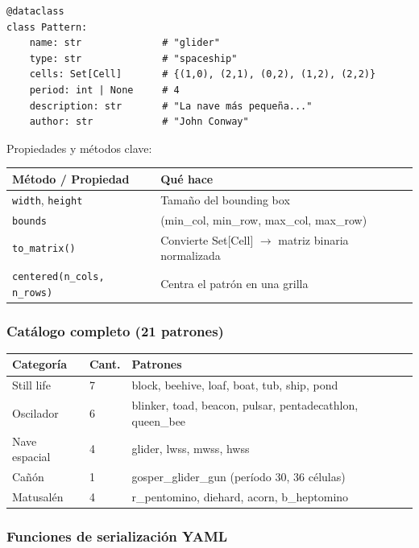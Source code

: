 \documentclass[12pt,a4paper]{article}
\begin{document}
\begin{lstlisting}
@dataclass
class Pattern:
    name: str              # "glider"
    type: str              # "spaceship"
    cells: Set[Cell]       # {(1,0), (2,1), (0,2), (1,2), (2,2)}
    period: int | None     # 4
    description: str       # "La nave más pequeña..."
    author: str            # "John Conway"
\end{lstlisting}

Propiedades y métodos clave:

\begin{table}[h]
\centering
\begin{tabular}{ll}
\toprule
\textbf{Método / Propiedad} & \textbf{Qué hace} \\
\midrule
\texttt{width}, \texttt{height} & Tamaño del bounding box \\
\texttt{bounds}                 & (min\_col, min\_row, max\_col, max\_row) \\
\texttt{to\_matrix()}           & Convierte Set[Cell] $\to$ matriz binaria normalizada \\
\texttt{centered(n\_cols, n\_rows)} & Centra el patrón en una grilla \\
\bottomrule
\end{tabular}
\end{table}

\subsubsection{Catálogo completo (21 patrones)}

\begin{table}[h]
\centering
\small
\begin{tabular}{llp{6cm}}
\toprule
\textbf{Categoría} & \textbf{Cant.} & \textbf{Patrones} \\
\midrule
Still life    & 7 & block, beehive, loaf, boat, tub, ship, pond \\
Oscilador     & 6 & blinker, toad, beacon, pulsar, pentadecathlon, queen\_bee \\
Nave espacial & 4 & glider, lwss, mwss, hwss \\
Cañón         & 1 & gosper\_glider\_gun (período 30, 36 células) \\
Matusalén     & 4 & r\_pentomino, diehard, acorn, b\_heptomino \\
\bottomrule
\end{tabular}
\end{table}

\subsubsection{Funciones de serialización YAML}
\end{document}
